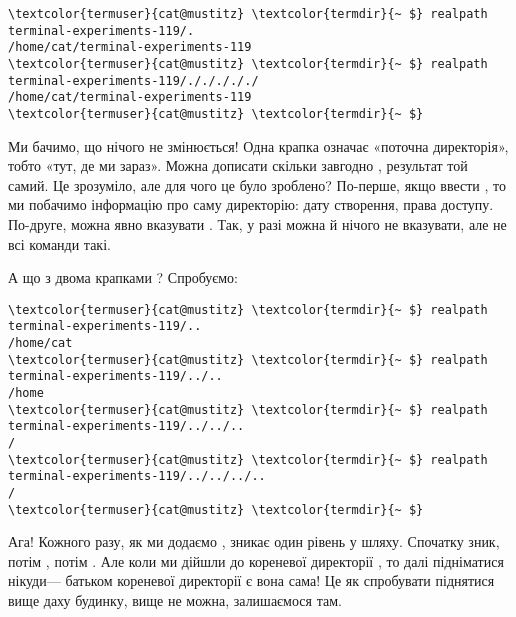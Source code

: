 \begin{Verbatim}[fontsize=\footnotesize,commandchars=\\\{\},xleftmargin=\parindent]
\textcolor{termuser}{cat@mustitz} \textcolor{termdir}{~ $} realpath terminal-experiments-119/.
/home/cat/terminal-experiments-119
\textcolor{termuser}{cat@mustitz} \textcolor{termdir}{~ $} realpath terminal-experiments-119/./././././
/home/cat/terminal-experiments-119
\textcolor{termuser}{cat@mustitz} \textcolor{termdir}{~ $}
\end{Verbatim}

Ми бачимо, що нічого не змінюється!
Одна крапка  означає «поточна директорія», тобто «тут, де ми зараз».
Можна дописати скільки завгодно , результат той самий.
Це зрозуміло, але для чого це було зроблено?
По-перше, якщо ввести , то ми побачимо інформацію про саму директорію: дату створення, права доступу.
По-друге, можна явно вказувати .
Так, у разі  можна й нічого не вказувати, але не всі команди такі.

А що з двома крапками ? Спробуємо:

\begin{Verbatim}[fontsize=\footnotesize,commandchars=\\\{\},xleftmargin=\parindent]
\textcolor{termuser}{cat@mustitz} \textcolor{termdir}{~ $} realpath terminal-experiments-119/..
/home/cat
\textcolor{termuser}{cat@mustitz} \textcolor{termdir}{~ $} realpath terminal-experiments-119/../..
/home
\textcolor{termuser}{cat@mustitz} \textcolor{termdir}{~ $} realpath terminal-experiments-119/../../..
/
\textcolor{termuser}{cat@mustitz} \textcolor{termdir}{~ $} realpath terminal-experiments-119/../../../..
/
\textcolor{termuser}{cat@mustitz} \textcolor{termdir}{~ $}
\end{Verbatim}

Ага! Кожного разу, як ми додаємо , зникає один рівень у шляху.
Спочатку  зник, потім , потім .
Але коли ми дійшли до кореневої директорії \file{/}, то далі підніматися нікуди---
батьком кореневої директорії є вона сама!
Це як спробувати піднятися вище даху будинку, вище не можна, залишаємося там.


